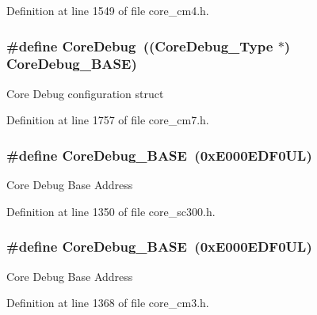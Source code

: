 Definition at line 1549 of file core\+\_\+cm4.\+h.

\subsubsection[{\texorpdfstring{Core\+Debug}{CoreDebug}}]{\setlength{\rightskip}{0pt plus 5cm}\#define Core\+Debug~(({\bf Core\+Debug\+\_\+\+Type} $\ast$)     {\bf Core\+Debug\+\_\+\+B\+A\+SE})}\hypertarget{group___c_m_s_i_s__core__base_gab6e30a2b802d9021619dbb0be7f5d63d}{}\label{group___c_m_s_i_s__core__base_gab6e30a2b802d9021619dbb0be7f5d63d}
Core Debug configuration struct 

Definition at line 1757 of file core\+\_\+cm7.\+h.

\subsubsection[{\texorpdfstring{Core\+Debug\+\_\+\+B\+A\+SE}{CoreDebug_BASE}}]{\setlength{\rightskip}{0pt plus 5cm}\#define Core\+Debug\+\_\+\+B\+A\+SE~(0x\+E000\+E\+D\+F0\+U\+L)}\hypertarget{group___c_m_s_i_s__core__base_ga680604dbcda9e9b31a1639fcffe5230b}{}\label{group___c_m_s_i_s__core__base_ga680604dbcda9e9b31a1639fcffe5230b}
Core Debug Base Address 

Definition at line 1350 of file core\+\_\+sc300.\+h.

\subsubsection[{\texorpdfstring{Core\+Debug\+\_\+\+B\+A\+SE}{CoreDebug_BASE}}]{\setlength{\rightskip}{0pt plus 5cm}\#define Core\+Debug\+\_\+\+B\+A\+SE~(0x\+E000\+E\+D\+F0\+U\+L)}\hypertarget{group___c_m_s_i_s__core__base_ga680604dbcda9e9b31a1639fcffe5230b}{}\label{group___c_m_s_i_s__core__base_ga680604dbcda9e9b31a1639fcffe5230b}
Core Debug Base Address 

Definition at line 1368 of file core\+\_\+cm3.\+h.

